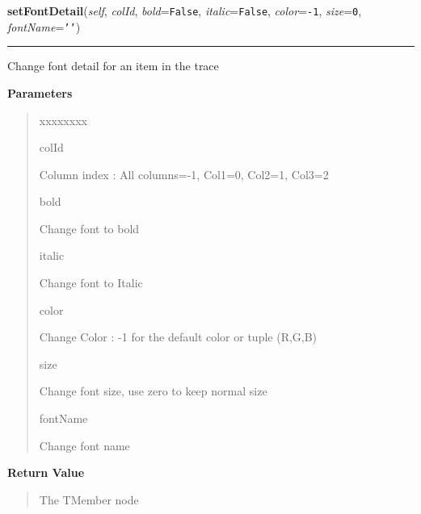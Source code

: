 \hspace{.8\funcindent}\begin{boxedminipage}{\funcwidth}

    \raggedright \textbf{setFontDetail}(\textit{self}, \textit{colId}, \textit{bold}={\tt False}, \textit{italic}={\tt False}, \textit{color}={\tt -1}, \textit{size}={\tt 0}, \textit{fontName}={\tt \texttt{'}\texttt{}\texttt{'}})

    \vspace{-1.5ex}

    \rule{\textwidth}{0.5\fboxrule}
\setlength{\parskip}{2ex}
    Change font detail for an item in the trace

\setlength{\parskip}{1ex}
      \textbf{Parameters}
      \vspace{-1ex}

      \begin{quote}
        \begin{Ventry}{xxxxxxxx}

          \item[colId]

          Column index : All columns=-1, Col1=0, Col2=1, Col3=2

          \item[bold]

          Change font to bold

          \item[italic]

          Change font to Italic

          \item[color]

          Change Color : -1 for the default color or tuple (R,G,B)

          \item[size]

          Change font size, use zero to keep normal size

          \item[fontName]

          Change font name

        \end{Ventry}

      \end{quote}

      \textbf{Return Value}
    \vspace{-1ex}

      \begin{quote}
      The TMember node

      \end{quote}

    \end{boxedminipage}

